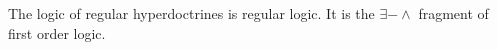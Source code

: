 \documentclass[12pt]{article}
\newtheorem{definition}[theorem]{Definition}
\newtheorem{example}[theorem]{Example}
\newtheorem{remark}[theorem]{Remark}
\begin{document}
The logic of regular hyperdoctrines is regular logic. It is the $\exists-\land$ fragment
of first order logic.
    
\end{document}
